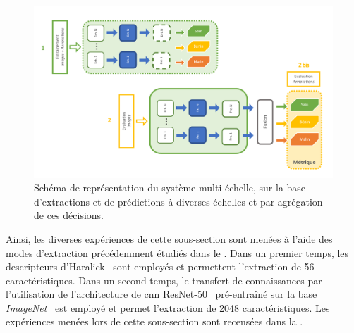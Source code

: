 \begin{figure}[H]
    \centering
    \includegraphics[width=0.85\linewidth]{contents/chapter_6/resources/scheme_image_improvement_multiscale_decision.pdf}
    \caption{Schéma de représentation du système multi-échelle, sur la base d'extractions et de prédictions à diverses échelles et par agrégation de ces décisions.}
    \label{fig:scheme_image_improvement_multiscale_decision}
\end{figure}\par

Ainsi, les diverses expériences de cette sous-section sont menées à l'aide des modes d'extraction précédemment étudiés dans le . Dans un premier temps, les descripteurs d'Haralick~ sont employés et permettent l'extraction de 56 caractéristiques. Dans un second temps, le transfert de connaissances par l'utilisation de l'architecture de \gls{cnn} ResNet-50~\cite{He2016} pré-entraîné sur la base \textit{ImageNet}~\cite{Canziani2016} est employé et permet l'extraction de 2048 caractéristiques. Les expériences menées lors de cette sous-section sont recensées dans la .\par

